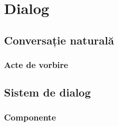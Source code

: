 \chapter{Dialog}

\section{Conversație naturală}

\subsection{Acte de vorbire}

\section{Sistem de dialog}

\subsection{Componente}